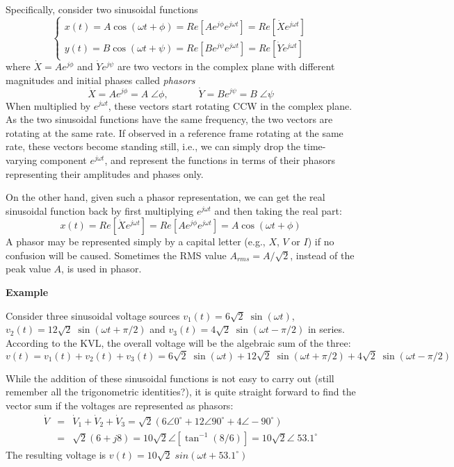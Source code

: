 

Specifically, consider two sinusoidal functions 
\[
\left\{ \begin{array}{l}
  x(t)=A\cos(\omega t+\phi)=Re[A e^{j\phi}e^{j\omega t}]=Re[\dot{X}e^{j\omega t}]\\
  y(t)=B\cos(\omega t+\psi)=Re[B e^{j\psi}e^{j\omega t}]=Re[\dot{Y}e^{j\omega t}]
\end{array} \right. 
\]
where $\dot{X}=A e^{j\phi}$ and $\dot{Y} e^{j\psi}$ are two vectors in 
the complex plane with different magnitudes and initial phases called 
{\em phasors} 
\[
\dot{X}=Ae^{j\phi}=A\;\angle\phi,
\;\;\;\;\;\;\;\;\;\;\;\dot{Y}=Be^{j\psi}=B\;\angle\psi
\]
When multiplied by $e^{j\omega t}$, these vectors start rotating CCW in the
complex plane. As the two sinusoidal functions have the same frequency, 
the two vectors are rotating at the same rate. If observed in a reference
frame rotating at the same rate, these vectors become standing still, 
i.e., we can simply drop the time-varying component $e^{j\omega t}$, and 
represent the functions in terms of their phasors representing their
amplitudes and phases only.

On the other hand, given such a phasor representation, we can get the 
real sinusoidal function back by first multiplying $e^{j\omega t}$ and then
taking the real part:
\[
x(t)=Re[\dot{X} e^{j\omega t}]=Re[A e^{j\phi} e^{j\omega t}]=A\cos(\omega t+\phi)
\]
A phasor may be represented simply by a capital letter (e.g., $X$, 
$V$ or $I$) if no confusion will be caused. Sometimes the RMS value
$A_{rms}=A/\sqrt{2}$, instead of the peak value $A$, is used in phasor.


{\bf Example} 

Consider three sinusoidal voltage sources $v_1(t)=6\sqrt{2}\;\sin(\omega t)$,
$v_2(t)=12\sqrt{2}\;\sin(\omega t+\pi/2)$ and 
$v_3(t)=4\sqrt{2}\;\sin(\omega t-\pi/2)$ in series. According to the KVL, the 
overall voltage will be the algebraic sum of the three:
\[ 	v(t)=v_1(t)+v_2(t)+v_3(t)
	=6\sqrt{2}\;\sin(\omega t)+12\sqrt{2}\;\sin(\omega t+\pi/2)
	+4\sqrt{2}\;\sin(\omega t-\pi/2)	\]


While the addition of these sinusoidal functions is not easy to carry out
(still remember all the trigonometric identities?), it is quite straight 
forward to find the vector sum if the voltages are represented as phasors:
\begin{eqnarray}
  \dot{V}&=&\dot{V}_1+\dot{V}_2+\dot{V}_3
  =\sqrt{2}(6\angle 0^\circ+12\angle 90^\circ+4\angle -90^\circ)
  \nonumber \\
  &=&\sqrt{2}(6+j8)=10\sqrt{2} \angle \left[\tan^{-1}(8/6)\right]
  =10\sqrt{2}\angle\; 53.1^\circ	
  \nonumber 
\end{eqnarray}
The resulting voltage is $v(t)=10\sqrt{2}\;sin(\omega t+53.1^\circ)$

